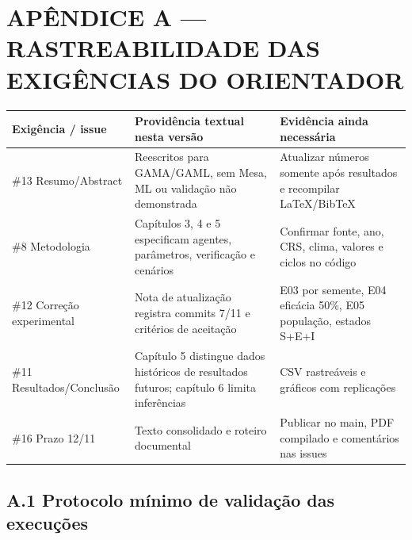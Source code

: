 \section{APÊNDICE A --- RASTREABILIDADE DAS EXIGÊNCIAS DO
ORIENTADOR}\label{apuxeandice-a-rastreabilidade-das-exiguxeancias-do-orientador}

\begin{longtable}[]{@{}
  >{\raggedright\arraybackslash}p{}
  >{\raggedright\arraybackslash}p{}
  >{\raggedright\arraybackslash}p{}@{}}
\toprule\noalign{}
\begin{minipage}[b]{\linewidth}\raggedright
\textbf{Exigência / issue}
\end{minipage} & \begin{minipage}[b]{\linewidth}\raggedright
\textbf{Providência textual nesta versão}
\end{minipage} & \begin{minipage}[b]{\linewidth}\raggedright
\textbf{Evidência ainda necessária}
\end{minipage} \\
\midrule\noalign{}
\endhead
\bottomrule\noalign{}
\endlastfoot
\#13 Resumo/Abstract & Reescritos para GAMA/GAML, sem Mesa, ML ou
validação não demonstrada & Atualizar números somente após resultados e
recompilar LaTeX/BibTeX \\
\#8 Metodologia & Capítulos 3, 4 e 5 especificam agentes, parâmetros,
verificação e cenários & Confirmar fonte, ano, CRS, clima, valores e
ciclos no código \\
\#12 Correção experimental & Nota de atualização registra commits 7/11 e
critérios de aceitação & E03 por semente, E04 eficácia 50\%, E05
população, estados S+E+I \\
\#11 Resultados/Conclusão & Capítulo 5 distingue dados históricos de
resultados futuros; capítulo 6 limita inferências & CSV rastreáveis e
gráficos com replicações \\
\#16 Prazo 12/11 & Texto consolidado e roteiro documental & Publicar no
main, PDF compilado e comentários nas issues \\
\end{longtable}

\subsection{A.1 Protocolo mínimo de validação das
execuções}\label{a.1-protocolo-muxednimo-de-validauxe7uxe3o-das-execuuxe7uxf5es}

